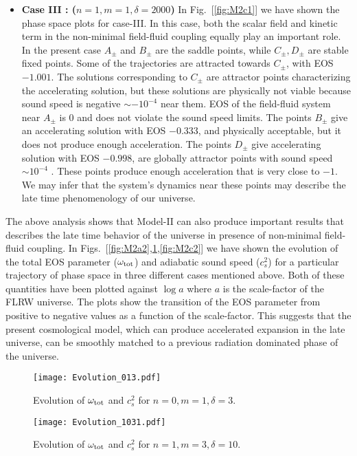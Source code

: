 \documentclass[a4paper,12pt]{article}
\begin{document}
\begin{itemize}
\item {\textbf{{Case III : ($n=1,  m=1, \delta = 2000$)}}}\; In Fig.~[\ref{fig:M2c1}] we have shown the phase space plots for case-III. In this case, both the scalar field and kinetic term in the non-minimal field-fluid coupling equally play an important role.  In the present case $A_{\pm}$ and $ B_{\pm} $ are the saddle points, while $C_{\pm},D_{\pm}$ are stable fixed points. Some of the trajectories are attracted towards $C_{\pm}$, with EOS $ -1.001 $. The solutions corresponding to $C_{\pm}$ are attractor points characterizing the accelerating solution, but these solutions are physically not viable because sound speed is negative $ \sim -10^{-4} $ near them. EOS of the field-fluid system near $A_{\pm}$ is $0$ and does not violate the sound speed limits. The points $B_{\pm}$ give an accelerating solution with EOS $-0.333$, and physically acceptable, but it does not produce enough acceleration. The  points $D_{\pm}$ give accelerating solution with EOS $-0.998$, are globally attractor points with sound speed $ \sim 10^{-4} $ \cite{Kumar:2019gfl}. These points produce enough acceleration that is very close to $ -1 $. We may infer that the system's dynamics near these points may describe the late time phenomenology of our universe.
\end{itemize}
The above analysis shows that Model-II can also produce important results that describes the late time behavior of the universe in presence of non-minimal field-fluid coupling. In  Figs.~[\ref{fig:M2a2},\ref{fig:M2b2},\ref{fig:M2c2}] we have shown the evolution of the total EOS parameter ($\omega_{\rm tot}$) and adiabatic sound speed ($c_s^2$) for a particular trajectory of phase space in three different cases mentioned above. Both of these quantities have been plotted against $\log a$ where $a$ is the scale-factor of the FLRW universe.  The plots show the transition of the EOS parameter from positive to negative values as a function of the scale-factor. This suggests that the present cosmological model, which can produce accelerated expansion in the late universe,  can be smoothly matched to a previous radiation dominated phase of the universe.  
\begin{figure}[t!]
\begin{minipage}[b]{0.5\linewidth}
\centering
\texttt{[image: Evolution\_013.pdf]}
\caption{Evolution of $\omega_{\rm tot} $ and $ c_{s}^2 $ for $ n=0,  m=1, \delta = 3$.}
\label{fig:M2a2}
\end{minipage}
\hspace{0.2cm}
\begin{minipage}[b]{0.5\linewidth}
\centering
\texttt{[image: Evolution\_1031.pdf]}
\caption{Evolution of $\omega_{\rm tot} $ and $ c_{s}^2 $ for  $n=1, m=3,  \delta = 10$.}
\label{fig:M2b2}
\end{minipage}
\end{figure}
\end{document}
